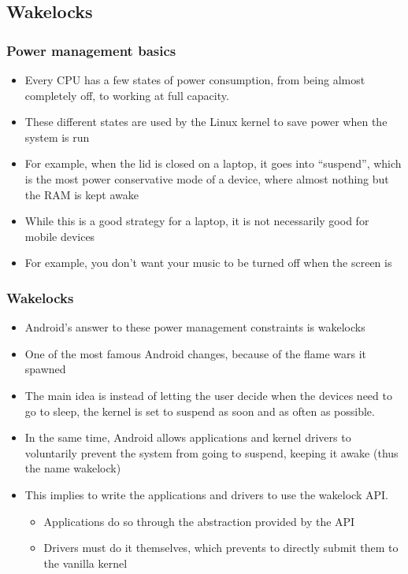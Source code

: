 \subsection{Wakelocks}
\begin{frame}
  \frametitle{Power management basics}
  \begin{itemize}
  \item Every CPU has a few states of power consumption, from being
    almost completely off, to working at full capacity.
  \item These different states are used by the Linux kernel to save
    power when the system is run
  \item For example, when the lid is closed on a laptop, it goes into
    ``suspend'', which is the most power conservative mode of a
    device, where almost nothing but the RAM is kept awake
  \item While this is a good strategy for a laptop, it is not
    necessarily good for mobile devices
  \item For example, you don't want your music to be turned off when
    the screen is
  \end{itemize}
\end{frame}

\begin{frame}
  \frametitle{Wakelocks}
  \begin{itemize}
  \item Android's answer to these power management constraints is wakelocks
  \item One of the most famous Android changes, because of the
    flame wars it spawned
  \item The main idea is instead of letting the user decide when
    the devices need to go to sleep, the kernel is set to suspend as
    soon and as often as possible. 
  \item In the same time, Android allows applications and kernel
    drivers to voluntarily prevent the system from going to suspend,
    keeping it awake (thus the name wakelock)
  \item This implies to write the applications and drivers to use the
    wakelock API.
    \begin{itemize}
    \item Applications do so through the abstraction provided by the
      API
    \item Drivers must do it themselves, which prevents to directly
      submit them to the vanilla kernel
    \end{itemize}
  \end{itemize}
\end{frame}

